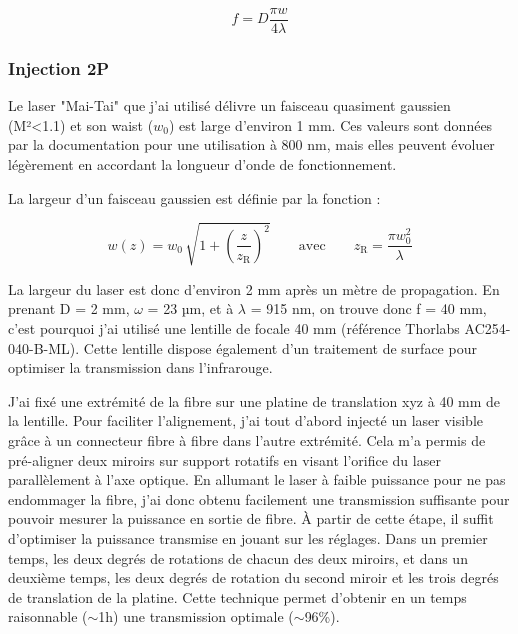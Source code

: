 $$
f = D\frac{\pi w}{4\lambda}
$$

\subsubsection{Injection 2P}

Le laser "Mai-Tai" que j'ai utilisé délivre un faisceau quasiment gaussien (M²<1.1) et son waist ($w_0$) est large d'environ 1 mm. Ces valeurs sont données par la documentation pour une utilisation à 800 nm, mais elles peuvent évoluer légèrement en accordant la longueur d'onde de fonctionnement.

La largeur d'un faisceau gaussien est définie par la fonction :

$$
w(z) = w_0 \, \sqrt{ 1+ {\left( \frac{z}{z_\mathrm{R}} \right)}^2 } \qquad \text{avec} \qquad
z_\mathrm{R} = \frac{\pi w_0^2 }{\lambda}
$$

La largeur du laser est donc d'environ 2 mm après un mètre de propagation. En prenant D = 2 mm, $\omega$ = 23 µm, et à $\lambda$ = 915 nm, on trouve donc f = 40 mm, c'est pourquoi j'ai utilisé une lentille de focale 40 mm (référence Thorlabs AC254-040-B-ML). Cette lentille dispose également d'un traitement de surface pour optimiser la transmission dans l'infrarouge.




J'ai fixé une extrémité de la fibre sur une platine de translation xyz à 40 mm de la lentille. Pour faciliter l'alignement, j'ai tout d'abord injecté un laser visible grâce à un connecteur fibre à fibre dans l'autre extrémité. Cela m'a permis de pré-aligner deux miroirs sur support rotatifs en visant l'orifice du laser parallèlement à l'axe optique. En allumant le laser à faible puissance pour ne pas endommager la fibre, j'ai donc obtenu facilement une transmission suffisante pour pouvoir mesurer la puissance en sortie de fibre. À partir de cette étape, il suffit d'optimiser la puissance transmise en jouant sur les réglages. Dans un premier temps, les deux degrés de rotations de chacun des deux miroirs, et dans un deuxième temps, les deux degrés de rotation du second miroir et les trois degrés de translation de la platine. Cette technique permet d'obtenir en un temps raisonnable ($\sim$1h) une transmission optimale ($\sim$96\%).

